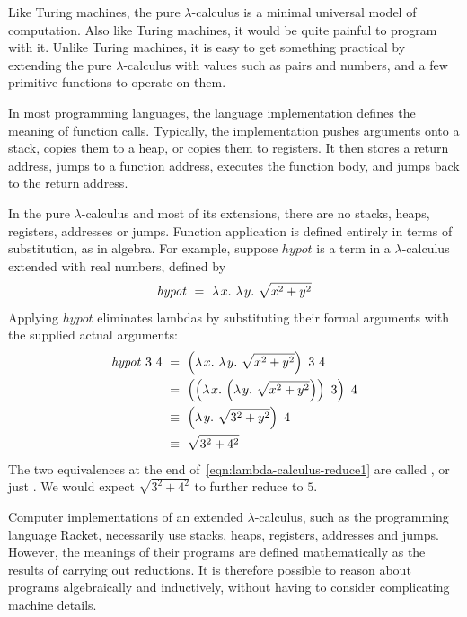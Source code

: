 Like Turing machines, the pure $\lambda$-calculus is a minimal universal model of computation.
Also like Turing machines, it would be quite painful to program with it.
Unlike Turing machines, it is easy to get something practical by extending the pure $\lambda$-calculus with values such as pairs and numbers, and a few primitive functions to operate on them.

In most programming languages, the language implementation defines the meaning of function calls.
Typically, the implementation pushes arguments onto a stack, copies them to a heap, or copies them to registers.
It then stores a return address, jumps to a function address, executes the function body, and jumps back to the return address.

In the pure $\lambda$-calculus and most of its extensions, there are no stacks, heaps, registers, addresses or jumps.
Function application is defined entirely in terms of substitution, as in algebra.
For example, suppose  $\mathit{hypot}$ is a term in a $\lambda$-calculus extended with real numbers, defined by
\begin{equation}
	\mathit{hypot}\ =\ \lambda\mspace{2mu}{x}\ldotp\,\lambda\mspace{2mu}{y}\ldotp\, \sqrt{x^2 + y^2}
\end{equation}
Applying $\mathit{hypot}$ eliminates lambdas by substituting their formal arguments with the supplied actual arguments:
\begin{equation}
\begin{aligned}
	\mathit{hypot}~3~4
		&\ =\ \left(\lambda\mspace{2mu}{x}\ldotp\,\lambda\mspace{2mu}{y}\ldotp\, \sqrt{x^2 + y^2}\right)~3~4 \\
		&\ =\ \left(\left(\lambda\mspace{2mu}{x}\ldotp\,\left(\lambda\mspace{2mu}{y}\ldotp\, \sqrt{x^2 + y^2}\right)\right)~3\right)~4 \\
		&\ \equiv\ \left(\lambda\mspace{2mu}{y}\ldotp\, \sqrt{3^2 + y^2}\right)~4 \\
		&\ \equiv\ \sqrt{3^2 + 4^2} \\
\end{aligned}
\label{eqn:lambda-calculus-reduce1}
\end{equation}
The two equivalences at the end of~\eqref{eqn:lambda-calculus-reduce1} are called , or just .
We would expect $\sqrt{3^2 + 4^2}$ to further reduce to $5$.

Computer implementations of an extended $\lambda$-calculus, such as the programming language Racket, necessarily use stacks, heaps, registers, addresses and jumps.
However, the meanings of their programs are defined mathematically as the results of carrying out reductions.
It is therefore possible to reason about programs algebraically and inductively, without having to consider complicating machine details.

